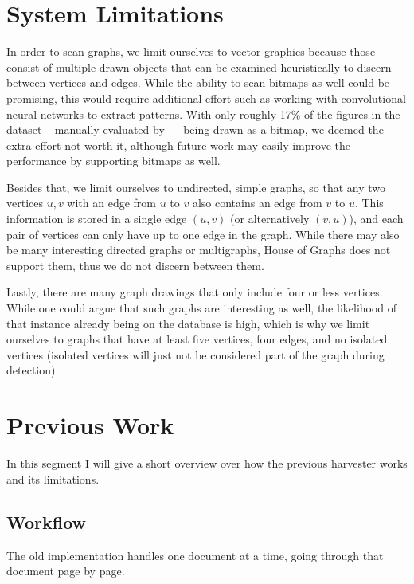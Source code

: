 \documentclass[practical,english]{info1thesis}
\begin{document}
\section{System Limitations}
In order to scan graphs, we limit ourselves to vector graphics because those consist of multiple drawn objects that can be examined heuristically to discern between vertices and edges.
While the ability to scan bitmaps as well could be promising, this would require additional effort such as working with convolutional neural networks to extract patterns.
With only roughly 17\% of the figures in the dataset -- manually evaluated by~\cite{mooney_et_al:LIPIcs.GD.2025.30} -- being drawn as a bitmap, we deemed the extra effort not worth it, although future work may easily improve the performance by supporting bitmaps as well.


Besides that, we limit ourselves to undirected, simple graphs, so that any two vertices $u,v$ with an edge from $u$ to $v$ also contains an edge from $v$ to $u$. 
This information is stored in a single edge $(u,v)$ (or alternatively $(v,u)$), and each pair of vertices can only have up to one edge in the graph.
While there may also be many interesting directed graphs or multigraphs, House of Graphs does not support them, thus we do not discern between them.


Lastly, there are many graph drawings that only include four or less vertices. 
While one could argue that such graphs are interesting as well, the likelihood of that instance already being on the database is high, which is why we limit ourselves to graphs that have at least five vertices, four edges, and no isolated vertices (isolated vertices will just not be considered part of the graph during detection).

\section{Previous Work}
In this segment I will give a short overview over how the previous harvester works and its limitations.
\subsection{Workflow}
The old implementation handles one document at a time, going through that document page by page.
\end{document}
